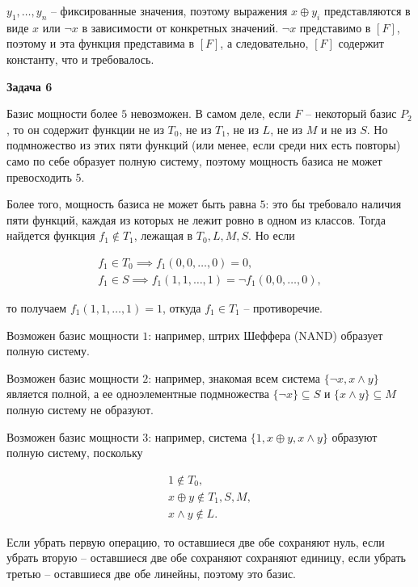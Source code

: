 		$y_1, \dots, y_n$ -- фиксированные значения, поэтому выражения $x \oplus y_i$ представляются в виде $x$ или $\neg x$ в зависимости от конкретных значений. $\neg x$ представимо в $[F]$, поэтому и эта функция представима в $[F]$, а следовательно, $[F]$ содержит константу, что и требовалось.


	\begin{center}
    \textbf{Задача 6}
\end{center}
		Базис мощности более $5$ невозможен. В самом деле, если $F$ -- некоторый базис $P_2$, то он содержит функции не из $T_0$, не из $T_1$, не из $L$, не из $M$ и не из $S$. Но подмножество из этих пяти функций (или менее, если среди них есть повторы) само по себе образует полную систему, поэтому мощность базиса не может превосходить $5$.

		Более того, мощность базиса не может быть равна $5$: это бы требовало наличия пяти функций, каждая из которых не лежит ровно в одном из классов. Тогда найдется функция $f_1 \not\in T_1$, лежащая в $T_0, L, M, S$. Но если

		\begin{gather*}
			f_1 \in T_0 \implies f_1(0, 0, \dots, 0) = 0, \\
			f_1 \in S \implies f_1(1, 1, \dots, 1) = \neg f_1(0, 0, \dots, 0),
		\end{gather*}

		то получаем $f_1(1, 1, \dots, 1) = 1$, откуда $f_1 \in T_1$ -- противоречие.

		Возможен базис мощности $1$: например, штрих Шеффера (NAND) образует полную систему.

		Возможен базис мощности $2$: например, знакомая всем система $\{\neg x, x \land y\}$ является полной, а ее одноэлементные подмножества $\{\neg x\} \subseteq S$ и $\{x \land y\} \subseteq M$ полную систему не образуют.

		Возможен базис мощности $3$: например, система $\{1, x \oplus y, x \land y\}$ образуют полную систему, поскольку

		\begin{gather*}
			1 \not\in T_0, \\
			x \oplus y \not\in T_1, S, M, \\
			x \land y \not\in L.
		\end{gather*}

		Если убрать первую операцию, то оставшиеся две обе сохраняют нуль, если убрать вторую -- оставшиеся две обе сохраняют сохраняют единицу, если убрать третью -- оставшиеся две обе линейны, поэтому это базис.

